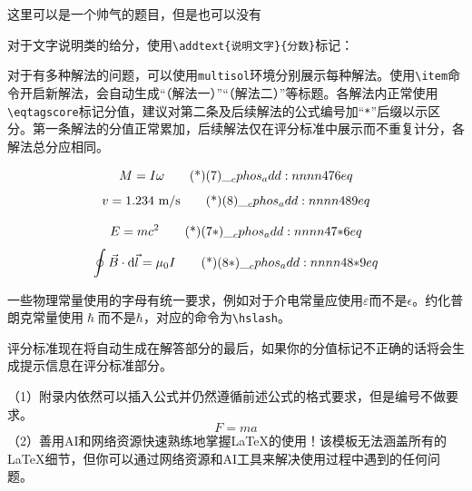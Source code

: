 \documentclass[answer]{cphos}
\begin{document}
\begin{problem}[40]{这里可以是一个帅气的题目，但是也可以没有}
\begin{solution}
对于文字说明类的给分，使用\texttt{\textbackslash addtext\{说明文字\}\{分数\}}标记：

对于有多种解法的问题，可以使用\texttt{multisol}环境分别展示每种解法。使用\texttt{\textbackslash item}命令开启新解法，会自动生成``（解法一）''``（解法二）''等标题。各解法内正常使用\texttt{\textbackslash eqtagscore}标记分值，建议对第二条及后续解法的公式编号加``\texttt{*}''后缀以示区分。第一条解法的分值正常累加，后续解法仅在评分标准中展示而不重复计分，各解法总分应相同。

\begin{multisol}
\item
\begin{equation}
    M = I\omega \eqtagscore{7}{6}
\end{equation}
\begin{equation}
    v = 1.234 \text{~m/s} \eqtagscore{8}{9}
\end{equation}
\item
\begin{equation}
    E = mc^2 \eqtagscore{7*}{6}
\end{equation}
\begin{equation}
    \oint \vec{B} \cdot \mathrm{d}\vec{l} = \mu_0 I \eqtagscore{8*}{9}
\end{equation}
\end{multisol}

一些物理常量使用的字母有统一要求，例如对于介电常量应使用$\varepsilon$而不是$\epsilon$。约化普朗克常量使用$\hslash$而不是$\hbar$，对应的命令为\texttt{\textbackslash hslash}。

评分标准现在将自动生成在解答部分的最后，如果你的分值标记不正确的话将会生成提示信息在评分标准部分。

\begin{problemreferences}
\end{problemreferences}

\scoring  %

\begin{problemappendix}
\noindent（1）附录内依然可以插入公式并仍然遵循前述公式的格式要求，但是编号不做要求。
\begin{equation*}
    F = ma
\end{equation*}
\noindent（2）善用AI和网络资源快速熟练地掌握\LaTeX 的使用！该模板无法涵盖所有的\LaTeX 细节，但你可以通过网络资源和AI工具来解决使用过程中遇到的任何问题。
\end{problemappendix}

\end{solution}

\end{problem}
\end{document}
